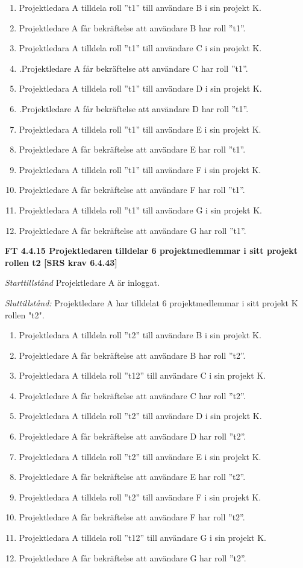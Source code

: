 \documentclass[a4paper]{article}
\begin{document}
\begin{enumerate}
\item Projektledara A tilldela roll ”t1” till användare B i sin projekt K. 
\item Projektledare A får bekräftelse att användare B har roll ”t1”.
\item Projektledara A tilldela roll ”t1” till användare C i sin projekt K. 
\item .Projektledare A får bekräftelse att användare C har roll ”t1”.
\item Projektledara A tilldela roll ”t1” till användare D i sin projekt K.
\item .Projektledare A får bekräftelse att användare D har roll ”t1”.
\item Projektledara A tilldela roll ”t1” till användare E i sin projekt K. 
\item Projektledare A får bekräftelse att användare E har roll ”t1”.
\item Projektledara A tilldela roll ”t1” till användare F i sin projekt K. 
\item Projektledare A får bekräftelse att användare F har roll ”t1”.
\item Projektledara A tilldela roll ”t1” till användare G i sin projekt K. 
\item Projektledare A får bekräftelse att användare G har roll ”t1”.
\end{enumerate}
\textbf{FT 4.4.15 Projektledaren tilldelar 6 projektmedlemmar i sitt projekt rollen t2 [SRS krav 6.4.43]}

\emph{Starttillstånd} Projektledare A är inloggat.

\emph{Sluttillstånd:} Projektledare A  har tilldelat 6 projektmedlemmar i sitt projekt K rollen "t2".

\begin{enumerate}
\item Projektledara A tilldela roll ”t2” till användare B i sin projekt K. 
\item Projektledare A får bekräftelse att användare B har roll ”t2”.
\item Projektledara A tilldela roll ”t12” till användare C i sin projekt K. 
\item Projektledare A får bekräftelse att användare C har roll ”t2”.
\item Projektledara A tilldela roll ”t2” till användare D i sin projekt K. 
\item Projektledare A får bekräftelse att användare D har roll ”t2”.
\item Projektledara A tilldela roll ”t2” till användare E i sin projekt K. 
\item Projektledare A får bekräftelse att användare E har roll ”t2”.
\item Projektledara A tilldela roll ”t2” till användare F i sin projekt K. 
\item Projektledare A får bekräftelse att användare F har roll ”t2”.
\item Projektledara A tilldela roll ”t12” till användare G i sin projekt K. 
\item Projektledare A får bekräftelse att användare G har roll ”t2”.
\end{enumerate}
\end{document}
